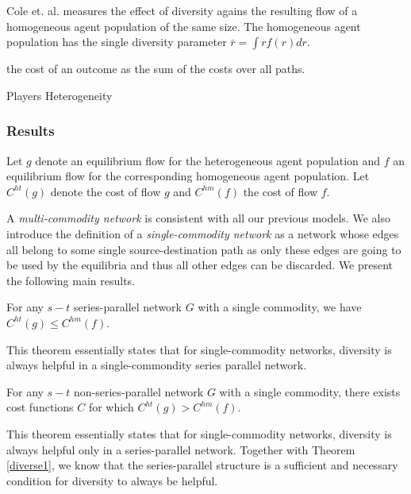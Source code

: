 Cole et. al. measures the effect of diversity agains the resulting flow of a homogeneous agent population of the same size. The homogeneous agent population has the single diversity parameter $\bar{r}=\int rf(r)d r$.


 the cost of an outcome as the sum of the costs over all paths. 

Players Heterogeneity

\subsubsection{Results}
Let $g$ denote an equilibrium flow for the heterogeneous agent population and $f$ an equilibrium flow for the corresponding homogeneous agent population. Let $C^{ht}(g)$ denote the cost of flow $g$ and $C^{hm}(f)$ the cost of flow $f$. 

A {\it multi-commodity network} is consistent with all our previous models. We also introduce the definition of a {\it single-commodity network} as a network whose edges all belong to some single source-destination path as only these edges are going to be used by the equilibria and thus all other edges can be discarded. We present the following main results.


\begin{theorem}
For any $s-t$ series-parallel network $G$ with a single commodity, we have $C^{ht}(g)\le C^{hm}(f)$.
\label{diverse1}
\end{theorem}

\begin{proof-sketch}



This theorem essentially states that for single-commodity networks, diversity is always helpful in a single-commondity series parallel network.
\end{proof-sketch}



\begin{theorem}
For any $s-t$ non-series-parallel network $G$ with a single commodity, there exists cost functions $C$ for which $C^{ht}(g)> C^{hm}(f)$.
\end{theorem}

\begin{proof-sketch}

This theorem essentially states that for single-commodity networks, diversity is always helpful only in a series-parallel network. Together with Theorem \ref{diverse1}, we know that the series-parallel structure is a sufficient and necessary condition for diversity to always be helpful.
\end{proof-sketch}


